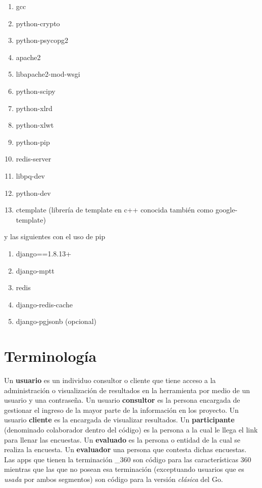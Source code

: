 \documentclass[10pt,a4paper]{book}
\begin{document}
	\begin{enumerate}
		\item gcc
		\item python-crypto
		\item python-psycopg2
		\item apache2
		\item libapache2-mod-wsgi
		\item python-scipy
		\item python-xlrd
		\item python-xlwt
		\item python-pip
		\item redis-server
		\item libpq-dev
		\item python-dev
		\item ctemplate (librería de template en c++ conocida también como google-template)
	\end{enumerate}

	y las siguientes con el uso de pip
	\begin{enumerate}
		\item django==1.8.13+ 
		\item django-mptt 
		\item redis 
		\item django-redis-cache
		\item django-pgjsonb (opcional)
	\end{enumerate}

	\section{Terminología}

	Un \textbf{usuario} es un individuo consultor o cliente que tiene acceso a la administración o visualización de resultados en la herramienta por medio de un usuario y una contraseña. Un usuario \textbf{consultor} es la persona encargada de gestionar el ingreso de la mayor parte de la información en los proyecto. Un usuario \textbf{cliente} es la encargada de visualizar resultados. Un \textbf{participante} (denominado colaborador dentro del código) es la persona a la cual le llega el link para llenar las encuestas. Un \textbf{evaluado} es la persona o entidad de la cual se realiza la encuesta. Un \textbf{evaluador} una persona que contesta dichas encuestas. Las apps que tienen la terminación \_360 son código para las características 360 mientras que las que no posean esa terminación (exceptuando usuarios que es \textit{usada} por ambos segmentos) son código para la versión \textit{clásica} del Go.
	
\end{document}
